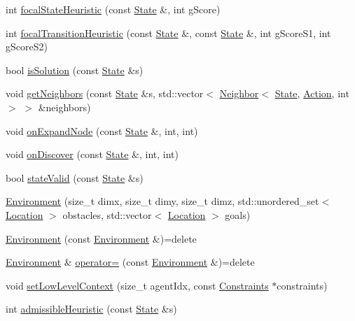 \begin{DoxyCompactItemize}
int \hyperlink{class_environment_a2ed02c2b1a21ae2aabb0e1758e945540}{focal\+State\+Heuristic} (const \hyperlink{struct_state}{State} \&, int g\+Score)
\item 
int \hyperlink{class_environment_ac799c113b3fd83ec89265786c9f29f37}{focal\+Transition\+Heuristic} (const \hyperlink{struct_state}{State} \&, const \hyperlink{struct_state}{State} \&, int g\+Score\+S1, int g\+Score\+S2)
\item 
bool \hyperlink{class_environment_aab14c04c6aaaf6b0d0f26f8b92d44400}{is\+Solution} (const \hyperlink{struct_state}{State} \&s)
\item 
void \hyperlink{class_environment_a4ae69480c6b9e716f282839dc4f323c0}{get\+Neighbors} (const \hyperlink{struct_state}{State} \&s, std\+::vector$<$ \hyperlink{structlib_multi_robot_planning_1_1_neighbor}{Neighbor}$<$ \hyperlink{struct_state}{State}, \hyperlink{a__star_8cpp_a8bb1ef53467e4f61410d12822d922498}{Action}, int $>$ $>$ \&neighbors)
\item 
void \hyperlink{class_environment_a37ccf718e3e1b4540dadbe89f1631ee6}{on\+Expand\+Node} (const \hyperlink{struct_state}{State} \&, int, int)
\item 
void \hyperlink{class_environment_a0c694f293bf62ef33dab4b878893bacf}{on\+Discover} (const \hyperlink{struct_state}{State} \&, int, int)
\item 
bool \hyperlink{class_environment_ad21a790ab0279b0f5b445e1f460dc971}{state\+Valid} (const \hyperlink{struct_state}{State} \&s)
\item 
\hyperlink{class_environment_a12b8baed8e6090b3eb528a27b1fecd0a}{Environment} (size\+\_\+t dimx, size\+\_\+t dimy, size\+\_\+t dimz, std\+::unordered\+\_\+set$<$ \hyperlink{struct_location}{Location} $>$ obstacles, std\+::vector$<$ \hyperlink{struct_location}{Location} $>$ goals)
\item 
\hyperlink{class_environment_abdb9fe9212fd5d47b5664df3e67c975f}{Environment} (const \hyperlink{class_environment}{Environment} \&)=delete
\item 
\hyperlink{class_environment}{Environment} \& \hyperlink{class_environment_a31a390fc46a51b9adab61b2511ef2a31}{operator=} (const \hyperlink{class_environment}{Environment} \&)=delete
\item 
void \hyperlink{class_environment_a56b6dff6d3af3fe6404936a14a259c56}{set\+Low\+Level\+Context} (size\+\_\+t agent\+Idx, const \hyperlink{struct_constraints}{Constraints} $\ast$constraints)
\item 
int \hyperlink{class_environment_a171e702c373005a9d6e77b79daa365d9}{admissible\+Heuristic} (const \hyperlink{struct_state}{State} \&s)

\end{DoxyCompactItemize}
